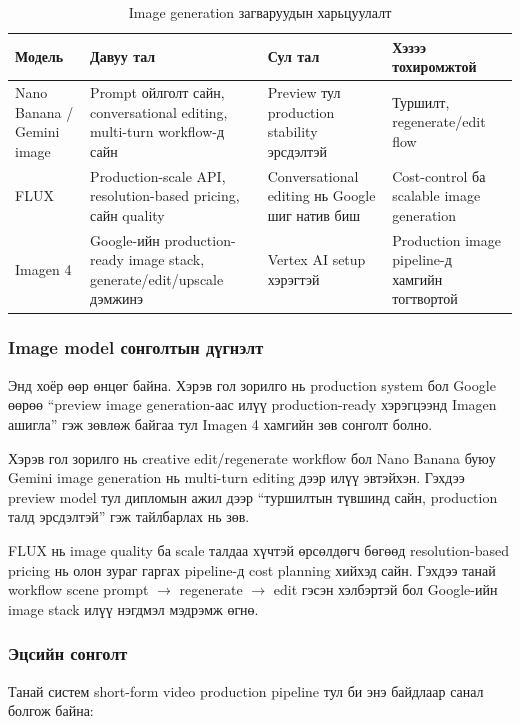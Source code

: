 \begin{table}[H]
\centering
\small
\begin{tabular}{|p{2.5cm}|p{3.5cm}|p{3.5cm}|p{3cm}|}
\hline
\textbf{Модель} & \textbf{Давуу тал} & \textbf{Сул тал} & \textbf{Хэзээ тохиромжтой} \\
\hline
Nano Banana / Gemini image & Prompt ойлголт сайн, conversational editing, multi-turn workflow-д сайн & Preview тул production stability эрсдэлтэй & Туршилт, regenerate/edit flow \\
\hline
FLUX & Production-scale API, resolution-based pricing, сайн quality & Conversational editing нь Google шиг натив биш & Cost-control ба scalable image generation \\
\hline
Imagen 4 & Google-ийн production-ready image stack, generate/edit/upscale дэмжинэ & Vertex AI setup хэрэгтэй & Production image pipeline-д хамгийн тогтвортой \\
\hline
\end{tabular}
\caption{Image generation загваруудын харьцуулалт}
\end{table}

\subsubsection{Image model сонголтын дүгнэлт}

Энд хоёр өөр өнцөг байна. Хэрэв гол зорилго нь production system бол Google өөрөө ``preview image generation-аас илүү production-ready хэрэгцээнд Imagen ашигла'' гэж зөвлөж байгаа тул Imagen 4 хамгийн зөв сонголт болно.

Хэрэв гол зорилго нь creative edit/regenerate workflow бол Nano Banana буюу Gemini image generation нь multi-turn editing дээр илүү эвтэйхэн. Гэхдээ preview model тул дипломын ажил дээр ``туршилтын түвшинд сайн, production талд эрсдэлтэй'' гэж тайлбарлах нь зөв.

FLUX нь image quality ба scale талдаа хүчтэй өрсөлдөгч бөгөөд resolution-based pricing нь олон зураг гаргах pipeline-д cost planning хийхэд сайн. Гэхдээ танай workflow scene prompt $\rightarrow$ regenerate $\rightarrow$ edit гэсэн хэлбэртэй бол Google-ийн image stack илүү нэгдмэл мэдрэмж өгнө.

\subsubsection{Эцсийн сонголт}

Танай систем short-form video production pipeline тул би энэ байдлаар санал болгож байна:


